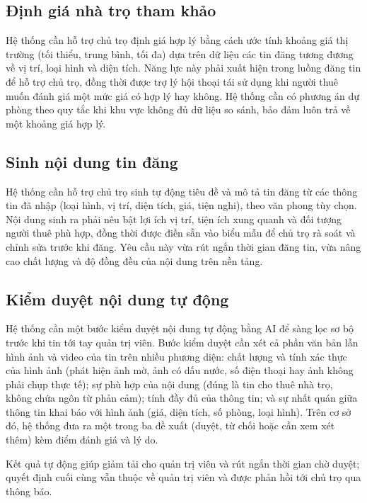 \FloatBarrier
\subsection{Định giá nhà trọ tham khảo}

Hệ thống cần hỗ trợ chủ trọ định giá hợp lý bằng cách ước tính khoảng giá thị trường (tối thiểu, trung bình, tối đa) dựa trên dữ liệu các tin đăng tương đương về vị trí, loại hình và diện tích. Năng lực này phải xuất hiện trong luồng đăng tin để hỗ trợ chủ trọ, đồng thời được trợ lý hội thoại tái sử dụng khi người thuê muốn đánh giá một mức giá có hợp lý hay không. Hệ thống cần có phương án dự phòng theo quy tắc khi khu vực không đủ dữ liệu so sánh, bảo đảm luôn trả về một khoảng giá hợp lý.

\FloatBarrier
\subsection{Sinh nội dung tin đăng}

Hệ thống cần hỗ trợ chủ trọ sinh tự động tiêu đề và mô tả tin đăng từ các thông tin đã nhập (loại hình, vị trí, diện tích, giá, tiện nghi), theo văn phong tùy chọn. Nội dung sinh ra phải nêu bật lợi ích vị trí, tiện ích xung quanh và đối tượng người thuê phù hợp, đồng thời được điền sẵn vào biểu mẫu để chủ trọ rà soát và chỉnh sửa trước khi đăng. Yêu cầu này vừa rút ngắn thời gian đăng tin, vừa nâng cao chất lượng và độ đồng đều của nội dung trên nền tảng.

\FloatBarrier
\subsection{Kiểm duyệt nội dung tự động}

Hệ thống cần một bước kiểm duyệt nội dung tự động bằng AI để sàng lọc sơ bộ trước khi tin tới tay quản trị viên. Bước kiểm duyệt cần xét cả phần văn bản lẫn hình ảnh và video của tin trên nhiều phương diện: chất lượng và tính xác thực của hình ảnh (phát hiện ảnh mờ, ảnh có dấu nước, số điện thoại hay ảnh không phải chụp thực tế); sự phù hợp của nội dung (đúng là tin cho thuê nhà trọ, không chứa ngôn từ phản cảm); tính đầy đủ của thông tin; và sự nhất quán giữa thông tin khai báo với hình ảnh (giá, diện tích, số phòng, loại hình). Trên cơ sở đó, hệ thống đưa ra một trong ba đề xuất (duyệt, từ chối hoặc cần xem xét thêm) kèm điểm đánh giá và lý do.

Kết quả tự động giúp giảm tải cho quản trị viên và rút ngắn thời gian chờ duyệt; quyết định cuối cùng vẫn thuộc về quản trị viên và được phản hồi tới chủ trọ qua thông báo.

